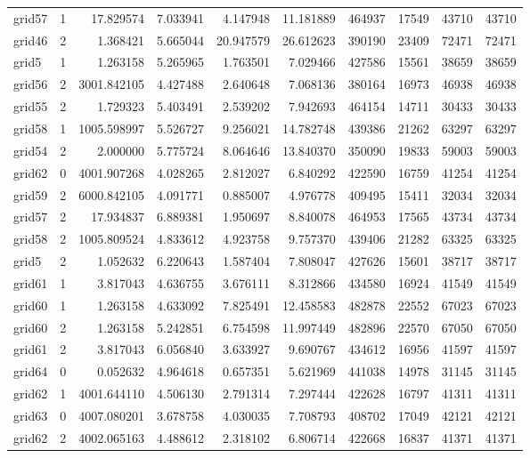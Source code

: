 \begin{longtable}{|l|r|r|r|r|r|r|r|r|r|}
grid57 & 1 & 17.829574 & 7.033941 & 4.147948 & 11.181889 & 464937 & 17549 & 43710 & 43710 \\
grid46 & 2 & 1.368421 & 5.665044 & 20.947579 & 26.612623 & 390190 & 23409 & 72471 & 72471 \\
grid5 & 1 & 1.263158 & 5.265965 & 1.763501 & 7.029466 & 427586 & 15561 & 38659 & 38659 \\
grid56 & 2 & 3001.842105 & 4.427488 & 2.640648 & 7.068136 & 380164 & 16973 & 46938 & 46938 \\
grid55 & 2 & 1.729323 & 5.403491 & 2.539202 & 7.942693 & 464154 & 14711 & 30433 & 30433 \\
grid58 & 1 & 1005.598997 & 5.526727 & 9.256021 & 14.782748 & 439386 & 21262 & 63297 & 63297 \\
grid54 & 2 & 2.000000 & 5.775724 & 8.064646 & 13.840370 & 350090 & 19833 & 59003 & 59003 \\
grid62 & 0 & 4001.907268 & 4.028265 & 2.812027 & 6.840292 & 422590 & 16759 & 41254 & 41254 \\
grid59 & 2 & 6000.842105 & 4.091771 & 0.885007 & 4.976778 & 409495 & 15411 & 32034 & 32034 \\
grid57 & 2 & 17.934837 & 6.889381 & 1.950697 & 8.840078 & 464953 & 17565 & 43734 & 43734 \\
grid58 & 2 & 1005.809524 & 4.833612 & 4.923758 & 9.757370 & 439406 & 21282 & 63325 & 63325 \\
grid5 & 2 & 1.052632 & 6.220643 & 1.587404 & 7.808047 & 427626 & 15601 & 38717 & 38717 \\
grid61 & 1 & 3.817043 & 4.636755 & 3.676111 & 8.312866 & 434580 & 16924 & 41549 & 41549 \\
grid60 & 1 & 1.263158 & 4.633092 & 7.825491 & 12.458583 & 482878 & 22552 & 67023 & 67023 \\
grid60 & 2 & 1.263158 & 5.242851 & 6.754598 & 11.997449 & 482896 & 22570 & 67050 & 67050 \\
grid61 & 2 & 3.817043 & 6.056840 & 3.633927 & 9.690767 & 434612 & 16956 & 41597 & 41597 \\
grid64 & 0 & 0.052632 & 4.964618 & 0.657351 & 5.621969 & 441038 & 14978 & 31145 & 31145 \\
grid62 & 1 & 4001.644110 & 4.506130 & 2.791314 & 7.297444 & 422628 & 16797 & 41311 & 41311 \\
grid63 & 0 & 4007.080201 & 3.678758 & 4.030035 & 7.708793 & 408702 & 17049 & 42121 & 42121 \\
grid62 & 2 & 4002.065163 & 4.488612 & 2.318102 & 6.806714 & 422668 & 16837 & 41371 & 41371 \\

\end{longtable}
